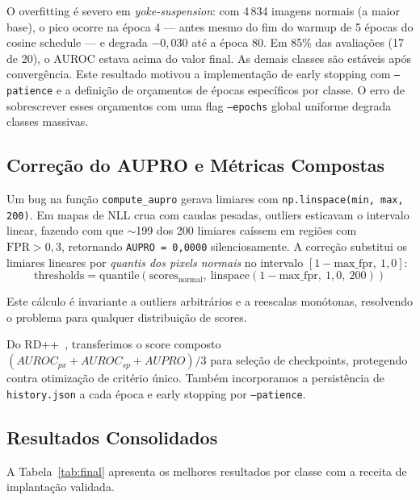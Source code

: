\documentclass[conference]{IEEEtran}
\begin{document}
O overfitting é severo em \textit{yoke-suspension}: com 4\,834 imagens normais (a maior base), o pico ocorre na época 4 --- antes mesmo do fim do warmup de 5 épocas do cosine schedule --- e degrada $-0{,}030$ até a época 80. Em 85\% das avaliações (17 de 20), o AUROC estava acima do valor final. As demais classes são estáveis após convergência. Este resultado motivou a implementação de early stopping com \texttt{--patience} e a definição de orçamentos de épocas específicos por classe. O erro de sobrescrever esses orçamentos com uma flag \texttt{--epochs} global uniforme degrada classes massivas.

\subsection{Correção do AUPRO e Métricas Compostas}
\label{sec:aupro}

Um bug na função \texttt{compute\_aupro} gerava limiares com \texttt{np.linspace(min, max, 200)}. Em mapas de NLL crua com caudas pesadas, outliers esticavam o intervalo linear, fazendo com que $\sim$199 dos 200 limiares caíssem em regiões com $\text{FPR} > 0{,}3$, retornando \texttt{AUPRO\,=\,0{,}0000} silenciosamente. A correção substitui os limiares lineares por \textit{quantis dos pixels normais} no intervalo $[1 - \text{max\_fpr},\ 1{,}0]$:
\begin{equation}
    \text{thresholds} = \text{quantile}(\text{scores}_{\text{normal}},\ \text{linspace}(1 - \text{max\_fpr},\ 1{,}0,\ 200))
\end{equation}

Este cálculo é invariante a outliers arbitrários e a reescalas monótonas, resolvendo o problema para qualquer distribuição de scores.

Do RD++~\cite{deng2022rd}, transferimos o score composto $(AUROC_{px} + AUROC_{sp} + AUPRO)/3$ para seleção de checkpoints, protegendo contra otimização de critério único. Também incorporamos a persistência de \texttt{history.json} a cada época e early stopping por \texttt{--patience}.

\subsection{Resultados Consolidados}
\label{sec:consolidated}

A Tabela~\ref{tab:final} apresenta os melhores resultados por classe com a receita de implantação validada.
\end{document}
